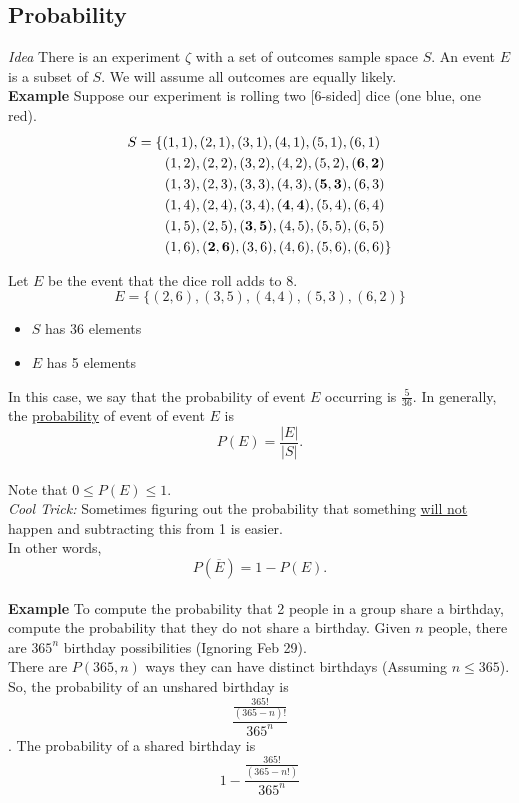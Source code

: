 \documentclass[12pt]{article}
\begin{document}
\subsection{Probability}
{\sl Idea} There is an experiment $\zeta$ with a set of outcomes sample space $S$. An event $E$ is a subset of $S$. We will assume all outcomes are equally likely.\\

{\bf Example} Suppose our experiment is rolling two [6-sided] dice (one blue, one red).
\begin{align}
    S&=\{(1,1),(2,1),(3,1),(4,1),(5,1),(6,1)\nonumber \\
    &\qquad (1,2),(2,2),(3,2),(4,2),(5,2),{\bf (6,2)}\nonumber \\
    &\qquad (1,3),(2,3),(3,3),(4,3),{\bf (5,3)},(6,3)\nonumber \\
    &\qquad (1,4),(2,4),(3,4),{\bf (4,4)},(5,4),(6,4)\nonumber \\
    &\qquad (1,5),(2,5),{\bf (3,5)},(4,5),(5,5),(6,5)\nonumber \\
    &\qquad (1,6),{\bf (2,6)},(3,6),(4,6),(5,6),(6,6)\nonumber\}
\end{align}

Let $E$ be the event that the dice roll adds to 8.
$$E=\{(2,6),(3,5),(4,4),(5,3),(6,2)\}$$
\begin{itemize}
    \item $S$ has 36 elements
    \item $E$ has 5 elements
\end{itemize}

In this case, we say that the probability of event $E$ occurring is $\frac{5}{36}$. In generally, the \underline{probability} of event of event $E$ is $$P(E) = \frac{|E|}{|S|}.$$\\
Note that $0\le P(E)\le 1$.\\

{\sl Cool Trick:} Sometimes figuring out the probability that something \underline{will not} happen and subtracting this from 1 is easier.\\

In other words, $$P(\overline{E}) = 1-P(E).$$\\

{\bf Example} To compute the probability that 2 people in a group share a birthday, compute the probability that they do not share a birthday. Given $n$ people, there are $365^n$ birthday possibilities (Ignoring Feb 29).\\

There are $P(365,n)$ ways they can have distinct birthdays (Assuming $n\le 365$). So, the probability of an unshared birthday is $$\frac{\frac{365!}{(365-n)!}}{365^n}$$. The probability of a shared birthday is $$1-\frac{\frac{365!}{(365-n!)}}{365^n}$$
\end{document}
